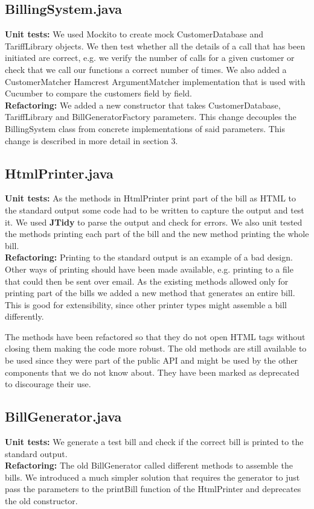 \documentclass[a4paper]{article}
\begin{document}
\subsection{BillingSystem.java}
{\bf Unit tests:} We used Mockito to create mock CustomerDatabase and TariffLibrary objects. We then test whether all the details of a call that has been initiated are correct, e.g. we verify the number of calls for a given customer or check that we call our functions a correct number of times. We also added a CustomerMatcher Hamcrest ArgumentMatcher implementation that is used with Cucumber to compare the customers field by field.
\\{\bf Refactoring:} We added a new constructor that takes CustomerDatabase, TariffLibrary and BillGeneratorFactory parameters. This change decouples the BillingSystem class from concrete implementations of said parameters. This change is described in more detail in section 3.

\subsection{HtmlPrinter.java}
{\bf Unit tests:} As the methods in HtmlPrinter print part of the bill as HTML to the standard output some code had to be written to capture the output and test it. We used {\bf JTidy} to parse the output and check for errors. We also unit tested the methods printing each part of the bill and the new method printing the whole bill.
\\{\bf Refactoring:} Printing to the standard output is an example of a bad design. Other ways of printing should have been made available, e.g. printing to a file that could then be sent over email. As the existing methods allowed only for printing part of the bills we added a new method that generates an entire bill. This is good for extensibility, since other printer types might assemble a bill differently.

The methods have been refactored so that they do not open HTML tags without closing them making the code more robust. The old methods are still available to be used since they were part of the public API and might be used by the other components that we do not know about. They have been marked as deprecated to discourage their use. 

\subsection{BillGenerator.java}
{\bf Unit tests:} We generate a test bill and check if the correct bill is printed to the standard output.
\\{\bf Refactoring:} The old BillGenerator called different methods to assemble the bills. We introduced a much simpler solution that requires the generator to just pass the parameters to the printBill function of the HtmlPrinter and deprecates the old constructor.
\end{document}
